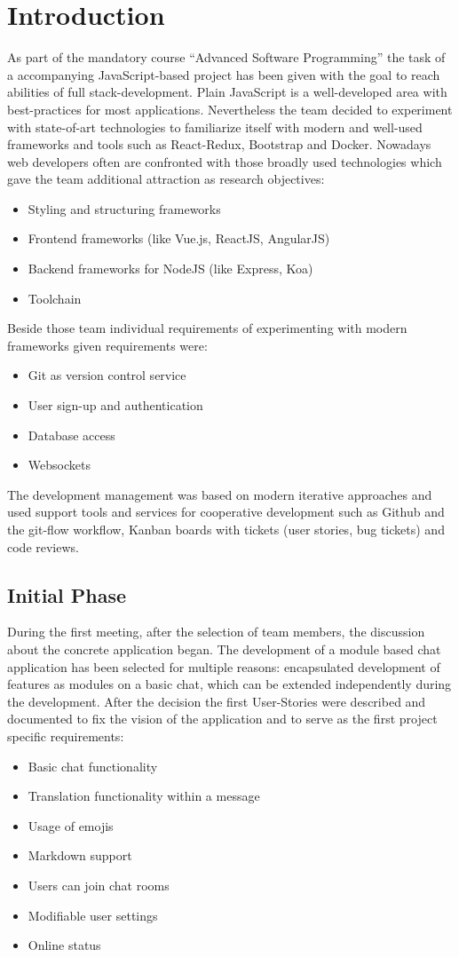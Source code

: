 \newpage
\section{Introduction}
As part of the mandatory course “Advanced Software Programming” the task of a accompanying JavaScript-based project has been given with the goal to reach abilities of full stack-development. Plain JavaScript is a well-developed area with best-practices for most applications. Nevertheless the team decided to experiment with state-of-art technologies to familiarize itself with modern and well-used frameworks and tools such as React-Redux, Bootstrap and Docker. Nowadays web developers often are confronted with those broadly used technologies which gave the team additional attraction as research objectives:
\begin{itemize}
	\item Styling and structuring frameworks
	\item Frontend frameworks (like Vue.js, ReactJS, AngularJS)
	\item Backend frameworks for NodeJS (like Express, Koa)
	\item Toolchain
\end{itemize}
Beside those team individual requirements of experimenting with modern frameworks given requirements were:
\begin{itemize}
	\item Git as version control service
	\item User sign-up and authentication
	\item Database access
	\item Websockets
\end{itemize}
The development management was based on modern iterative approaches and used support tools and services for cooperative development such as Github and the git-flow workflow, Kanban boards with tickets (user stories, bug tickets) and code reviews.

\subsection{Initial Phase}
During the first meeting, after the selection of team members, the discussion about the concrete application began. The development of a module based chat application has been selected for multiple reasons: encapsulated development of features as modules on a basic chat, which can be extended independently during the development. After the decision the first User-Stories were described and documented to fix the vision of the application and to serve as the first project specific requirements:
\begin{itemize}
	\item Basic chat functionality
	\item Translation functionality within a message
	\item Usage of emojis
	\item Markdown support
	\item Users can join chat rooms
	\item Modifiable user settings
	\item Online status
\end{itemize}

